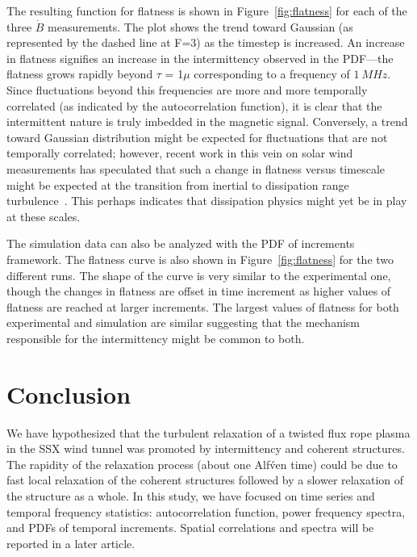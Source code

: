 \documentclass[12pt]{iopart}
\begin{document}
The resulting function for flatness is shown in Figure~\ref{fig:flatness} for each of the three $\dot{B}$ measurements. The plot shows the trend toward Gaussian (as represented by the dashed line at F=3) as the timestep is increased. An increase in flatness signifies an increase in the intermittency observed in the PDF---the flatness grows rapidly beyond $\tau$ = 1$\mu$ corresponding to a frequency of $1~MHz$. Since fluctuations beyond this frequencies are more and more temporally correlated (as indicated by the autocorrelation function), it is clear that the intermittent nature is truly imbedded in the magnetic signal. Conversely, a trend toward Gaussian distribution might be expected for fluctuations that are not temporally correlated; however, recent work in this vein on solar wind measurements has speculated that such a change in flatness versus timescale might be expected at the transition from inertial to dissipation range turbulence~\cite{wan12_apj}. This perhaps indicates that dissipation physics might yet be in play at these scales.

The simulation data can also be analyzed with the PDF of increments framework. The flatness curve is also shown in Figure~\ref{fig:flatness} for the two different runs. The shape of the curve is very similar to the experimental one, though the changes in flatness are offset in time increment as higher values of flatness are reached at larger increments. The largest values of flatness for both experimental and simulation are similar suggesting that the mechanism responsible for the intermittency might be common to both.

\section{Conclusion}

We have hypothesized that the turbulent relaxation of a twisted flux rope plasma in the SSX wind tunnel was promoted by intermittency and coherent structures.  The rapidity of the relaxation process (about one Alf\'ven time) could be due to fast local relaxation of the coherent structures followed by a slower relaxation of the structure as a whole.  In this study, we have focused on time series and temporal frequency statistics: autocorrelation function, power frequency spectra, and PDFs of temporal increments.  Spatial correlations and spectra will be reported in a later article.
\end{document}
